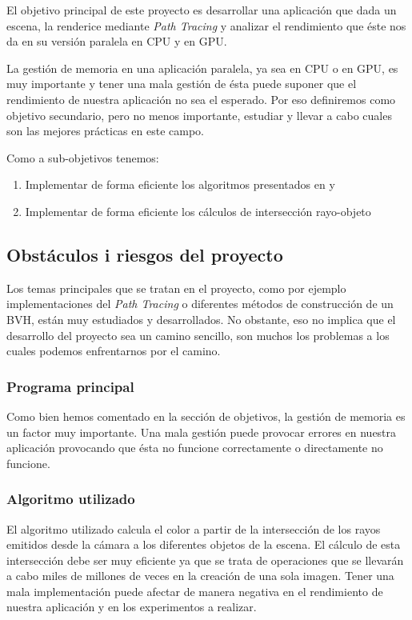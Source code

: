 \documentclass[twoside,a4paper,titlepage,11pt]{report}
\begin{document}
El objetivo principal de este proyecto es desarrollar una aplicación que dada un escena, la renderice mediante \textit{Path Tracing} y analizar el rendimiento que éste nos da en su versión paralela en CPU y en GPU.

La gestión de memoria en una aplicación paralela, ya sea en CPU o en GPU, es muy importante y tener una mala gestión de ésta puede suponer que el rendimiento de nuestra aplicación no sea el esperado. Por eso definiremos como objetivo secundario, pero no menos importante, estudiar y llevar a cabo cuales son las mejores prácticas en este campo.

Como a sub-objetivos tenemos:

\begin{enumerate}
	\item Implementar de forma eficiente los algoritmos presentados en \citep{Shirley2018a} y \cite{Karras2012}
	\item Implementar de forma eficiente los cálculos de intersección rayo-objeto
\end{enumerate}

\subsection{Obstáculos i riesgos del proyecto}

Los temas principales que se tratan en el proyecto, como por ejemplo implementaciones del \textit{Path Tracing} o diferentes métodos de construcción de un BVH, están muy estudiados y desarrollados. No obstante, eso no implica que el desarrollo del proyecto sea un camino sencillo, son muchos los problemas a los cuales podemos enfrentarnos por el camino.

\subsubsection{Programa principal}

Como bien hemos comentado en la sección de objetivos, la gestión de memoria es un factor muy importante. Una mala gestión puede provocar errores en nuestra aplicación provocando que ésta no funcione correctamente o directamente no funcione.

\subsubsection{Algoritmo utilizado}

El algoritmo utilizado calcula el color a partir de la intersección de los rayos emitidos desde la cámara a los diferentes objetos de la escena. El cálculo de esta intersección debe ser muy eficiente ya que se trata de operaciones que se llevarán a cabo miles de millones de veces en la creación de una sola imagen. Tener una mala implementación puede afectar de manera negativa en el rendimiento de nuestra aplicación y en los experimentos a realizar.
\end{document}
